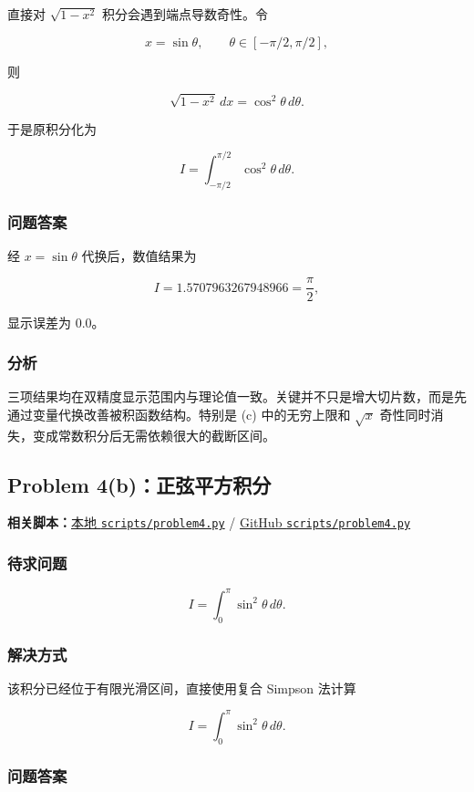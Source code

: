 \documentclass[12pt,a4paper,fontset=none]{ctexart}
\newcommand{\fileinline}[1]{{\urlstyle{same}\nolinkurl{#1}}}
\newcommand{\metadataline}[1]{#1}
\newcommand{\scriptpath}[1]{\fileinline{#1}}
\newcommand{\githubscriptsbase}{https://github.com/Void0312Aurora/computational-physics-homework-2026/blob/main/07/scripts}
\newcommand{\scriptlink}[1]{\noindent\metadataline{\textbf{相关脚本：}\href{../../../scripts/#1}{本地 \scriptpath{scripts/#1}} / \href{\githubscriptsbase/#1}{GitHub \scriptpath{scripts/#1}}}\par\medskip}
\begin{document}
直接对 \(\sqrt{1-x^2}\) 积分会遇到端点导数奇性。令

\[
x=\sin\theta,\qquad \theta\in[-\pi/2,\pi/2],
\]

则

\[
\sqrt{1-x^2}\,dx=\cos^2\theta\,d\theta.
\]

于是原积分化为

\[
I=\int_{-\pi/2}^{\pi/2}\cos^2\theta\,d\theta.
\]

\subsubsection{问题答案}\label{ux95eeux9898ux7b54ux6848-7}

经 \(x=\sin\theta\) 代换后，数值结果为

\[
I=1.5707963267948966=\frac{\pi}{2},
\]

显示误差为 \(0.0\)。

\subsubsection{分析}\label{ux5206ux6790-7}

三项结果均在双精度显示范围内与理论值一致。关键并不只是增大切片数，而是先通过变量代换改善被积函数结构。特别是 (c) 中的无穷上限和 \(\sqrt{x}\) 奇性同时消失，变成常数积分后无需依赖很大的截断区间。

\subsection{Problem 4(b)：正弦平方积分}\label{problem-4b}

\scriptlink{problem4.py}

\subsubsection{待求问题}\label{ux5f85ux6c42ux95eeux9898-8}

\[
I=\int_0^\pi\sin^2\theta\,d\theta.
\]

\subsubsection{解决方式}\label{ux89e3ux51b3ux65b9ux5f0f-8}

该积分已经位于有限光滑区间，直接使用复合 Simpson 法计算

\[
I=\int_0^\pi\sin^2\theta\,d\theta.
\]

\subsubsection{问题答案}\label{ux95eeux9898ux7b54ux6848-8}
\end{document}
